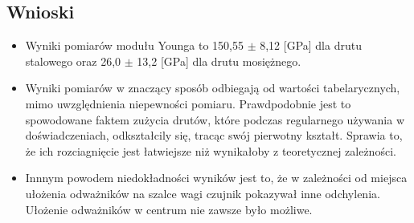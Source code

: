 \documentclass[]{article}
\begin{document}
\newpage
\subsection{Wnioski}
\begin{itemize}
		\item Wyniki pomiarów modułu Younga to 150,55 \(\pm\) 8,12 [GPa] dla drutu stalowego oraz 26,0 \(\pm\) 13,2 [GPa] dla drutu mosiężnego.
		\item  Wyniki pomiarów w znaczący sposób odbiegają od wartości tabelarycznych, mimo uwzględnienia niepewności pomiaru. Prawdpodobnie jest to spowodowane faktem zużycia drutów, które podczas regularnego używania w doświadczeniach, odkształcily się, tracąc swój pierwotny kształt. Sprawia to, że ich rozciagnięcie jest łatwiejsze niż wynikałoby z teoretycznej zależności.
		\item Innnym powodem niedokładności wyników jest to, że w zależności od miejsca ułożenia odważników na szalce wagi czujnik pokazywał inne odchylenia. Ułożenie odważników w centrum nie zawsze było możliwe. 
	\end{itemize}
\end{document}
